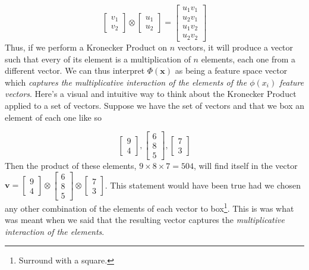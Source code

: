 \documentclass{article}
\theoremstyle{definition}
\theoremstyle{definition}
\begin{document}
\[
    \begin{bmatrix}
        v_1 \\ v_2
    \end{bmatrix}
    \otimes
    \begin{bmatrix}
        u_1 \\ u_2
    \end{bmatrix}
    =
    \begin{bmatrix}
        u_1 v_1 \\ u_2 v_1 \\ u_1v_2 \\ u_2v_2
    \end{bmatrix}
\]
Thus, if we perform a Kronecker Product on $n$ vectors, it will produce a vector such that every of its element is a multiplication of $n$ elements, each one from a different vector. We can thus interpret $\Phi(\mathbf{x})$ as being a feature space vector which \emph{captures the multiplicative interaction of the elements of the $\phi(x_i)$ feature vectors}. Here's a visual and intuitive way to think about the Kronecker Product applied to a set of vectors. Suppose we have the set of vectors and that we box an element of each one like so

\[
    \begin{bmatrix}
        \boxed{9} \\ 4
    \end{bmatrix},
    \begin{bmatrix}
        6 \\ \boxed{8} \\ 5
    \end{bmatrix},
    \begin{bmatrix}
        \boxed{7} \\ 3
    \end{bmatrix}
\]
Then the product of these elements,  $9\times8\times7=504$, will find itself in the vector $\bm{v}=
    \begin{bmatrix}
        9 \\ 4
    \end{bmatrix}
    \otimes
    \begin{bmatrix}
        6 \\ 8 \\ 5
    \end{bmatrix}
    \otimes
    \begin{bmatrix}
        7 \\ 3
    \end{bmatrix}
$. This statement would have been true had we chosen any other combination of the elements of each vector to box\footnote{Surround with a square.}. This is was what was meant when we said that the resulting vector captures the \emph{multiplicative interaction of the elements}.
\end{document}
